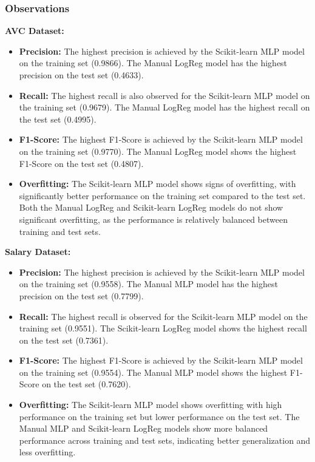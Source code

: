 \documentclass[a4paper,12pt]{article}
\begin{document}
\subsubsection{Observations}

\textbf{AVC Dataset:}
\begin{itemize}
    \item \textbf{Precision:} The highest precision is achieved by the Scikit-learn MLP model on the training set (0.9866). The Manual LogReg model has the highest precision on the test set (0.4633).
    \item \textbf{Recall:} The highest recall is also observed for the Scikit-learn MLP model on the training set (0.9679). The Manual LogReg model has the highest recall on the test set (0.4995).
    \item \textbf{F1-Score:} The highest F1-Score is achieved by the Scikit-learn MLP model on the training set (0.9770). The Manual LogReg model shows the highest F1-Score on the test set (0.4807).
    \item \textbf{Overfitting:} The Scikit-learn MLP model shows signs of overfitting, with significantly better performance on the training set compared to the test set. Both the Manual LogReg and Scikit-learn LogReg models do not show significant overfitting, as the performance is relatively balanced between training and test sets.
\end{itemize}

\textbf{Salary Dataset:}
\begin{itemize}
    \item \textbf{Precision:} The highest precision is achieved by the Scikit-learn MLP model on the training set (0.9558). The Manual MLP model has the highest precision on the test set (0.7799).
    \item \textbf{Recall:} The highest recall is observed for the Scikit-learn MLP model on the training set (0.9551). The Scikit-learn LogReg model shows the highest recall on the test set (0.7361).
    \item \textbf{F1-Score:} The highest F1-Score is achieved by the Scikit-learn MLP model on the training set (0.9554). The Manual MLP model shows the highest F1-Score on the test set (0.7620).
    \item \textbf{Overfitting:} The Scikit-learn MLP model shows overfitting with high performance on the training set but lower performance on the test set. The Manual MLP and Scikit-learn LogReg models show more balanced performance across training and test sets, indicating better generalization and less overfitting.
\end{itemize}
\end{document}

